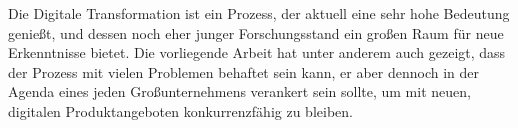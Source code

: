 Die Digitale Transformation ist ein Prozess, der aktuell eine sehr hohe Bedeutung genießt, und dessen noch eher junger Forschungsstand ein großen Raum für neue Erkenntnisse bietet. Die vorliegende Arbeit hat unter anderem auch gezeigt, dass der Prozess mit vielen Problemen behaftet sein kann, er aber dennoch in der Agenda eines jeden Großunternehmens verankert sein sollte, um mit neuen, digitalen Produktangeboten konkurrenzfähig zu bleiben.